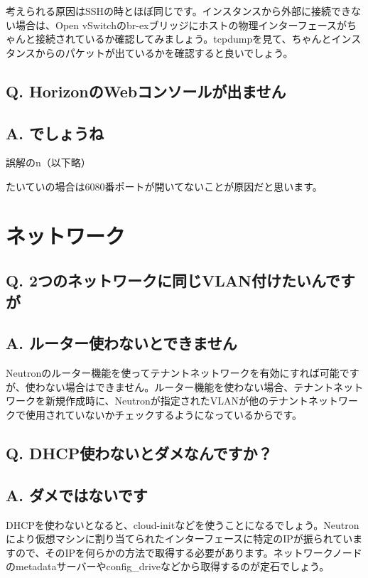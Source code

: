 \documentclass[9pt,b5paper,tombo,openany]{jsbook}
\begin{document}
考えられる原因はSSHの時とほぼ同じです。インスタンスから外部に接続できない場合は、Open vSwitchのbr-exブリッジにホストの物理インターフェースがちゃんと接続されているか確認してみましょう。tcpdumpを見て、ちゃんとインスタンスからのパケットが出ているかを確認すると良いでしょう。

\subsection*{{\bfseries Q.} HorizonのWebコンソールが出ません}
\subsection*{{\bfseries A.} でしょうね}
誤解のn（以下略）

たいていの場合は6080番ポートが開いてないことが原因だと思います。

\section{ネットワーク}

\subsection*{{\bfseries Q.} 2つのネットワークに同じVLAN付けたいんですが}
\subsection*{{\bfseries A.} ルーター使わないとできません}
Neutronのルーター機能を使ってテナントネットワークを有効にすれば可能ですが、使わない場合はできません。ルーター機能を使わない場合、テナントネットワークを新規作成時に、Neutronが指定されたVLANが他のテナントネットワークで使用されていないかチェックするようになっているからです。

\subsection*{{\bfseries Q.} DHCP使わないとダメなんですか？}
\subsection*{{\bfseries A.} ダメではないです}
DHCPを使わないとなると、cloud-initなどを使うことになるでしょう。Neutronにより仮想マシンに割り当てられたインターフェースに特定のIPが振られていますので、そのIPを何らかの方法で取得する必要があります。ネットワークノードのmetadataサーバーやconfig\_driveなどから取得するのが定石でしょう。
\end{document}
